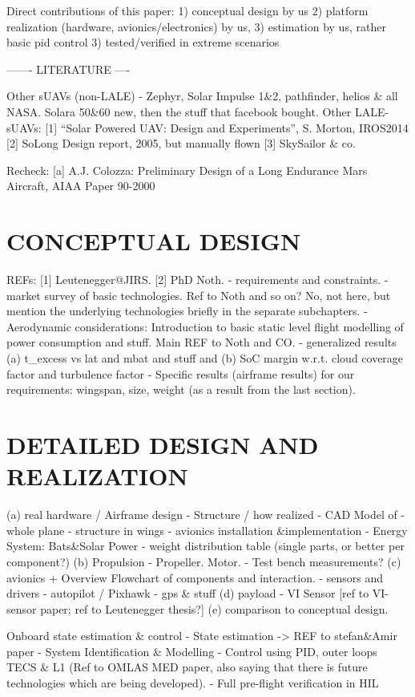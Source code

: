 \documentclass[letterpaper, 10 pt, conference]{ieeeconf}  %
\begin{document}
   Direct contributions of this paper:
1) conceptual design by us
2) platform realization (hardware, avionics/electronics) by us, 
3) estimation by us, rather basic pid control
3) tested/verified in extreme scenarios
   
   
   ------- LITERATURE ----

Other sUAVs (non-LALE)
 - Zephyr, Solar Impulse 1\&2, pathfinder, helios \& all NASA. Solara 50\&60 new, then the stuff that facebook bought.
Other LALE-sUAVs:
[1]  ``Solar Powered UAV: Design and Experiments'', S. Morton, IROS2014
[2] SoLong Design report, 2005, but manually flown
[3] SkySailor \& co.

Recheck: 
[a] A.J. Colozza: Preliminary Design of a Long Endurance Mars Aircraft, AIAA Paper 90-2000

\section{CONCEPTUAL DESIGN}
REFs: [1] Leutenegger@JIRS. [2] PhD Noth.
 - requirements and constraints.
 - market survey of basic technologies. Ref to Noth and so on? No, not here, but mention the underlying technologies briefly in the separate subchapters.
   - Aerodynamic considerations: Introduction to basic static level flight modelling of power consumption and stuff. Main REF to Noth and CO.
   - generalized results (a) t\_excess vs lat and mbat and stuff and (b) SoC margin w.r.t. cloud coverage factor and turbulence factor
   - Specific results (airframe results) for our requirements: wingspan, size, weight (as a result from the last section).
  
\section{DETAILED DESIGN AND REALIZATION}
(a) real hardware / Airframe design
  - Structure / how realized
  - CAD Model of
  	- whole plane
  	- structure in wings
  	- avionics installation \&implementation
   - Energy System: Bats\&Solar Power
   - weight distribution table (single parts, or better per component?)
(b) Propulsion
  - Propeller. Motor.
  - Test bench measurements?
(c) avionics
 + Overview Flowchart of components and interaction.
   - sensors and drivers
   - autopilot / Pixhawk
   - gps \& stuff
(d) payload
  - VI Sensor [ref to VI-sensor paper; ref to Leutenegger thesis?]
(e) comparison to conceptual design.

Onboard state estimation \& control
 - State estimation -> REF to stefan\&Amir paper
 - System Identification \& Modelling
 - Control using PID,  outer loops TECS \& L1 (Ref to OMLAS MED paper, also saying that there is future technologies which are being developed).
 - Full pre-flight verification in HIL
 
\end{document}
